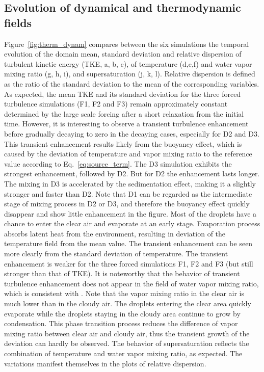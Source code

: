 \documentclass[draft,linenumbers]{agujournal}
\newcommand{\Eq}[1]{Eq.~\eqref{#1}} \newcommand{\Fig}[1]{Figure~\ref{#1}}
\begin{document}
\subsection{Evolution of dynamical and thermodynamic fields}
\Fig{fig:therm_dynam} compares between the six simulations the temporal evolution of the domain mean, standard deviation and relative dispersion of turbulent kinetic energy (TKE, a, b, c), of temperature (d,e,f) and water vapor mixing ratio (g, h, i), and supersaturation (j, k, l). Relative dispersion is defined as the ratio of the standard deviation to the mean of the corresponding variables. As expected, the mean TKE and its standard deviation for the three forced turbulence simulations (F1, F2 and F3) remain approximately constant determined by the large scale forcing after a short relaxation from the initial time. However, it is interesting to observe a transient turbulence enhancement before gradually decaying to zero in the decaying cases, especially for D2 and D3. This transient enhancement results likely from the buoyancy effect, which is caused by the deviation of temperature and vapor mixing ratio to the reference value according to \Eq{eq:source_term}. The D3 simulation exhibits the strongest enhancement, followed by D2. But for D2 the enhancement lasts longer. The mixing in D3 is accelerated by the sedimentation effect, making it a slightly stronger and faster than D2. Note that D1 can be regarded as the intermediate stage of mixing process in D2 or D3, and therefore the buoyancy effect quickly disappear and show little enhancement in the figure.  Most of the droplets have a chance to enter the clear air and evaporate at an early stage. Evaporation process absorbs latent heat from the environment, resulting in deviation of the temperature field from the mean value. The transient enhancement can be seen more clearly from the standard deviation of temperature. The transient enhancement is weaker for the three forced simulations F1, F2 and F3 (but still stronger than that of TKE).  It is noteworthy that the behavior of transient turbulence enhancement does not appear in the field of water vapor mixing ratio, which is consistent with \citet{Kumar14}. Note that the vapor mixing ratio in the clear air is much lower than in the cloudy air. The droplets entering the clear area quickly evaporate while the droplets staying in the cloudy area continue to grow by condensation. This phase transition process reduces the difference of vapor mixing ratio between clear air and cloudy air, thus the transient growth of the deviation can hardly be observed.  The behavior of supersaturation reflects the combination of temperature and water vapor mixing ratio, as expected. The variations manifest themselves in the plots of relative dispersion.
\end{document}
